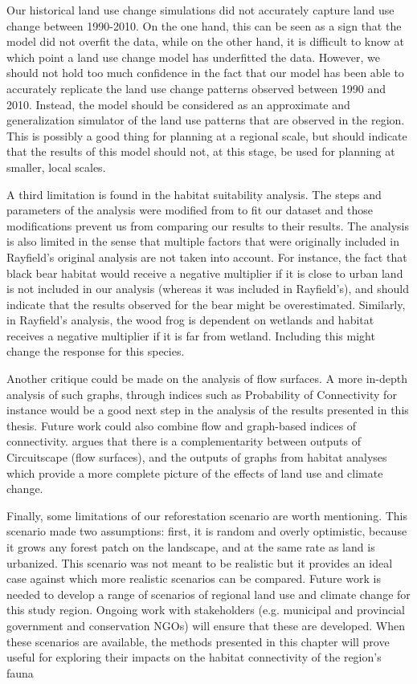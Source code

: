 Our historical land use change simulations did not accurately capture land use change between 1990-2010. On the one hand, this can be seen as a sign that the model did not overfit the data, while on the other hand, it is difficult to know at which point a land use change model has underfitted the data. However, we should not hold too much confidence in the fact that our model has been able to accurately replicate the land use change patterns observed  between 1990 and 2010. Instead, the model should be considered as an approximate and generalization simulator of the land use patterns that are observed in the region. This is possibly a good thing for planning at a regional scale, but should indicate that the results of this model should not, at this stage, be used for planning at smaller, local scales.

A third limitation is found in the habitat suitability analysis. The steps and parameters of the analysis were modified from \cite{rayfield_priorisation_2018} to fit our dataset and those modifications prevent us from comparing our results to their results. The analysis is also limited in the sense that multiple factors that were originally included in Rayfield's original analysis are not taken into account. For instance, the fact that black bear habitat would receive a negative multiplier if it is close to urban land is not included in our analysis (whereas it was included in Rayfield's), and should indicate that the results observed for the bear might be overestimated. Similarly, in Rayfield's analysis, the wood frog is dependent on wetlands and habitat receives a negative multiplier if it is far from wetland. Including this might change the response  for this species.

Another critique could be made on the analysis of flow surfaces. A more in-depth analysis of such graphs, through indices such as Probability of Connectivity for instance \citep{saura_new_2007} would be a good next step in the analysis of the results presented in this thesis. Future work could also combine flow and graph-based indices of connectivity. \cite{rayfield_priorisation_2018} argues that there is a complementarity between outputs of Circuitscape (flow surfaces), and the outputs of graphs from habitat analyses which provide a more complete picture of the effects of land use and climate change. 

Finally, some limitations of our reforestation scenario are worth mentioning. This scenario made two assumptions: first, it is random and overly optimistic, because it grows any forest patch on the landscape, and at the same rate as land is urbanized. This scenario was not meant to be realistic but it provides an ideal case against which more realistic scenarios can be compared. Future work is needed to develop a range of scenarios of regional land use and climate change for this study region. Ongoing work with stakeholders (e.g. municipal and provincial government and conservation NGOs) will ensure that these are developed. When these scenarios are available, the methods presented in this chapter will prove useful for exploring their impacts on the habitat connectivity of the region’s fauna \\


